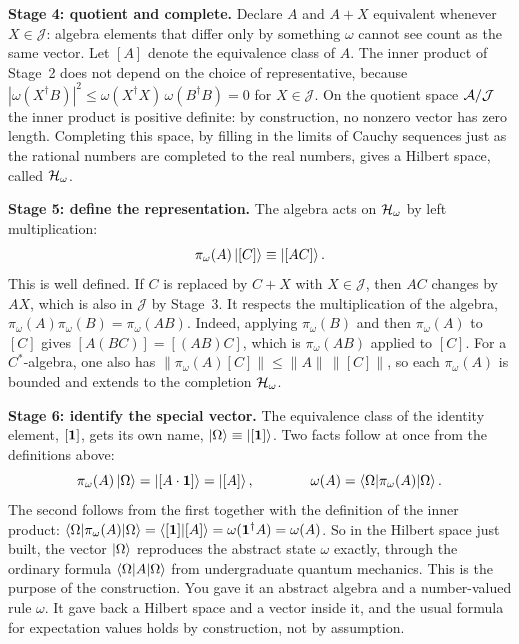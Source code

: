 \textbf{Stage 4: quotient and complete.} Declare $A$ and $A+X$ equivalent whenever $X\in\mathcal J$: algebra
elements that differ only by something $\omega$ cannot see count as the same vector. Let $[A]$ denote the
equivalence class of $A$. The inner product of Stage~2 does not depend on the choice of representative,
because $|\omega(X^\dagger B)|^2\le\omega(X^\dagger X)\,\omega(B^\dagger B)=0$ for $X\in\mathcal J$. On the
quotient space $\mathcal{A}/\mathcal J$ the inner product is positive definite: by construction, no nonzero vector
has zero length. Completing this space, by filling in the limits of Cauchy sequences just as the rational
numbers are completed to the real numbers, gives a Hilbert space, called $\mathcal{H}_\omega$.

\textbf{Stage 5: define the representation.} The algebra acts on $\mathcal{H}_\omega$ by left multiplication:
\[
\pi_\omega(A)\ket{[C]} \equiv \ket{[AC]} .
\]
This is well defined. If $C$ is replaced by $C+X$ with $X\in\mathcal J$, then $AC$ changes by $AX$, which is
also in $\mathcal J$ by Stage~3. It respects the multiplication of the algebra,
$\pi_\omega(A)\pi_\omega(B)=\pi_\omega(AB)$. Indeed, applying $\pi_\omega(B)$ and then $\pi_\omega(A)$ to $[C]$
gives $[A(BC)]=[(AB)C]$, which is $\pi_\omega(AB)$ applied to $[C]$. For a $C^*$-algebra, one also has
$\|\pi_\omega(A)[C]\|\le\|A\|\,\|[C]\|$, so each $\pi_\omega(A)$ is bounded and extends to the completion
$\mathcal{H}_\omega$.

\textbf{Stage 6: identify the special vector.} The equivalence class of the identity element, $[\mathbf{1}]$, gets
its own name, $\ket\Omega\equiv\ket{[\mathbf{1}]}$. Two facts follow at once from the definitions above:
\[
\pi_\omega(A)\ket\Omega = \ket{[A\cdot\mathbf{1}]} = \ket{[A]}, \qquad\qquad
\omega(A) = \braket{\Omega|\pi_\omega(A)|\Omega} .
\]
The second follows from the first together with the definition of the inner product:
$\braket{\Omega|\pi_\omega(A)|\Omega} = \braket{[\mathbf{1}]|[A]} = \omega(\mathbf{1}^\dagger A)=\omega(A)$. So in the Hilbert
space just built, the vector $\ket\Omega$ reproduces the abstract state $\omega$ exactly, through the ordinary
formula $\braket{\Omega|A|\Omega}$ from undergraduate quantum mechanics. This is the purpose of the
construction. You gave it an abstract algebra and a number-valued rule $\omega$. It gave back a Hilbert space
and a vector inside it, and the usual formula for expectation values holds by construction, not by
assumption.

